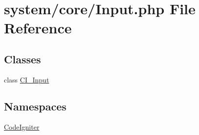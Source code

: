 \hypertarget{_input_8php}{}\section{system/core/\+Input.php File Reference}
\label{_input_8php}
\subsection*{Classes}
\begin{DoxyCompactItemize}
\item 
class \mbox{\hyperlink{class_c_i___input}{C\+I\+\_\+\+Input}}
\end{DoxyCompactItemize}
\subsection*{Namespaces}
\begin{DoxyCompactItemize}
\item 
 \mbox{\hyperlink{namespace_code_igniter}{Code\+Igniter}}
\end{DoxyCompactItemize}

